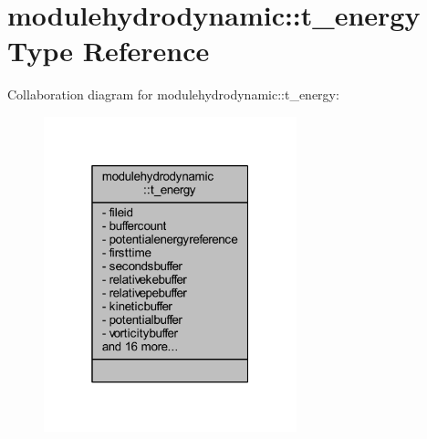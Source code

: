 \hypertarget{structmodulehydrodynamic_1_1t__energy}{}\section{modulehydrodynamic\+:\+:t\+\_\+energy Type Reference}
\label{structmodulehydrodynamic_1_1t__energy}


Collaboration diagram for modulehydrodynamic\+:\+:t\+\_\+energy\+:\nopagebreak
\begin{figure}[H]
\begin{center}
\leavevmode
\includegraphics[width=208pt]{structmodulehydrodynamic_1_1t__energy__coll__graph}
\end{center}
\end{figure}
